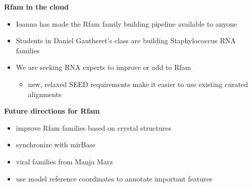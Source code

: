 \documentclass[landscape]{slides}
\begin{document}
\begin{slide}
\begin{center}
  \textbf{Rfam in the cloud}
  \small
  \begin{itemize}  
  \item Ioanna has made the Rfam family building pipeline available to anyone
  \item Students in Daniel Gautheret's class are building Staphylococcus RNA families
  \item We are seeking RNA experts to improve or add to Rfam
    \begin {itemize}
      \item new, relaxed SEED requirements make it easier to use existing curated alignments 
    \end{itemize}
  \end{itemize}

  \normalsize
  \textbf{Future directions for Rfam}
  \small
  \begin{itemize}  
  \item improve Rfam families based on crystal structures
  \item synchronize with mirBase
  \item viral families from Manja Marz
  \item use model reference coordinates to annotate important features 
  \end{itemize}
\end{center}    
\vfill
\end{slide}
\end{document}
